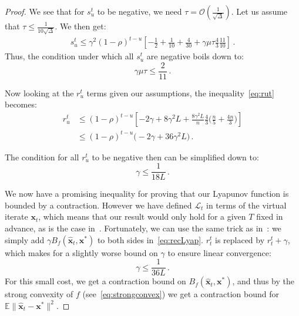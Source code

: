 \documentclass{article}
\def\EE{{\mathbb E}}
\def\xx{{\boldsymbol x}}
\begin{document}
\begin{proof}
  We see that for $s_u^t$ to be negative, we need $\tau = \mathcal{O}(\frac{1}{\sqrt{\Delta}})$.
  Let us assume that $\tau \leq \frac{1}{10 \sqrt{\Delta}}$.
  We then get:
  \begin{equation}
  \begin{aligned}
  s_u^t \leq \gamma^2 (1 - \rho)^{t - u} \left[ - \frac{1}{2} + \frac{1}{10} + \frac{4}{30} + \gamma \mu \tau \frac{4}{3} \frac{11}{10} \right]\,.
  \end{aligned}
  \end{equation}
  Thus, the condition under which all $s_u^t$ are negative boils down to:
  \begin{equation} \label{eq:stepTauCondition}
  \gamma \mu \tau \leq \frac{2}{11}\,.
  \end{equation}

  Now looking at the $r_u^t$ terms given our assumptions, the inequality~\eqref{eq:rut} becomes:
  \begin{align}
  r_u^t &\leq (1 - \rho)^{t - u} \left[ -2 \gamma + 8 \gamma^2 L + \frac{8 \gamma^2 L}{n} \frac{4}{3}\big(\frac{n}{5} + \frac{4n}{3}\big)\right] \nonumber\\
  &\leq (1 - \rho)^{t - u} \big(-2 \gamma + 36 \gamma^2 L\big)\,.
  \end{align}

  The condition for all $r_u^t$ to be negative then can be simplified down to:
  \begin{equation}
  \gamma \leq \frac{1}{18L}\,.
  \end{equation}

  We now have a promising inequality for proving that our Lyapunov function is bounded by a contraction.
  However we have defined $\mathcal{L}_t$ in terms of the virtual iterate $\xx_t$, which means that our result would only hold for a given $T$ fixed in advance, as is the case in~\citet{mania2015perturbed}.
  Fortunately, we can use the same trick as in~\citet[Eq.~(97)]{leblond2016Asaga}: we simply add $\gamma B_f(\hat \xx_t, \xx^*)$ to both sides in~\eqref{eq:recLyap}.
  $r_t^t$ is replaced by $r_t^t + \gamma$, which makes for a slightly worse bound on $\gamma$ to ensure linear convergence:
  \begin{equation}  \label{eq:stepCondition}
  \gamma \leq \frac{1}{36L} \, .
  \end{equation}
  For this small cost, we get a contraction bound on $B_f(\hat \xx_t, \xx^*)$, and thus by the strong convexity of $f$ (see~\eqref{eq:strongconvex}) we get a contraction bound for $\EE \|\hat \xx_t - \xx^*\|^2$.


\end{proof}
\end{document}
